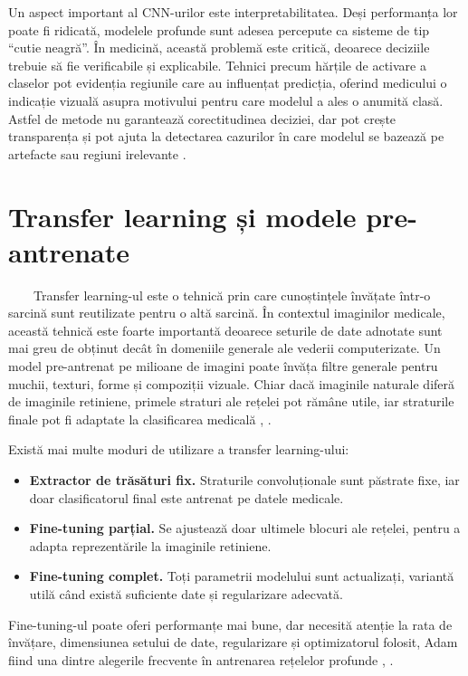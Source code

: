 \documentclass[12pt, a4paper, twoside, romanian]{teza-upb}
\begin{document}
Un aspect important al CNN-urilor este interpretabilitatea. Deși performanța lor poate fi
ridicată, modelele profunde sunt adesea percepute ca sisteme de tip ``cutie neagră''.
În medicină, această problemă este critică, deoarece deciziile trebuie să fie verificabile
și explicabile. Tehnici precum hărțile de activare a claselor pot evidenția regiunile
care au influențat predicția, oferind medicului o indicație vizuală asupra motivului pentru
care modelul a ales o anumită clasă. Astfel de metode nu garantează
corectitudinea deciziei, dar pot crește transparența și pot ajuta la detectarea cazurilor
în care modelul se bazează pe artefacte sau regiuni irelevante \cite{9_chetoui2020explainable}.

\section{Transfer learning și modele pre-antrenate}

\ \ \ \ Transfer learning-ul este o tehnică prin care cunoștințele învățate într-o sarcină sunt
reutilizate pentru o altă sarcină. În contextul imaginilor medicale, această tehnică este
foarte importantă deoarece seturile de date adnotate sunt mai greu de obținut
decât în domeniile generale ale vederii computerizate. Un model pre-antrenat pe milioane
de imagini poate învăța filtre generale pentru muchii, texturi, forme și compoziții
vizuale. Chiar dacă imaginile naturale diferă de imaginile retiniene, primele straturi ale
rețelei pot rămâne utile, iar straturile finale pot fi adaptate la clasificarea
medicală \cite{10_jabbar2022transfer}, \cite{19_lecun2015deep}.
\bigskip

Există mai multe moduri de utilizare a transfer learning-ului:

\begin{itemize}
  \item \textbf{Extractor de trăsături fix.} Straturile convoluționale sunt păstrate fixe, iar doar clasificatorul
    final este antrenat pe datele medicale.
  \item \textbf{Fine-tuning parțial.} Se ajustează doar ultimele blocuri ale rețelei, pentru a adapta
    reprezentările la imaginile retiniene.
  \item \textbf{Fine-tuning complet.} Toți parametrii modelului sunt actualizați, variantă utilă când există suficiente
    date și regularizare adecvată.
\end{itemize}

Fine-tuning-ul poate oferi performanțe mai bune, dar necesită atenție la rata de
învățare, dimensiunea setului de date, regularizare și optimizatorul folosit, Adam fiind una
dintre alegerile frecvente în antrenarea rețelelor profunde \cite{10_jabbar2022transfer}, \cite{23_kingma2014adam}.
\bigskip
\end{document}
